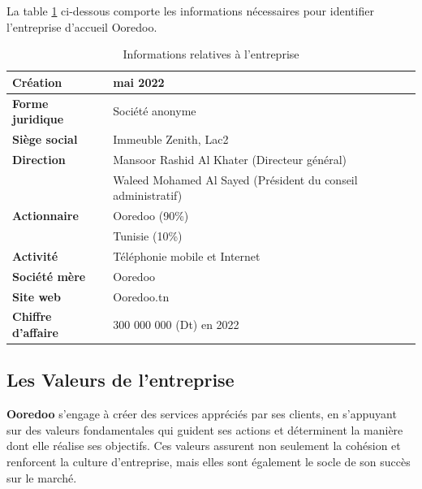 La table \ref{valeursooredoo} ci-dessous comporte les informations nécessaires pour identifier l’entreprise d’accueil Ooredoo.
\begin{table}[H] %
    \renewcommand{\arraystretch}{1.1} %
    \centering
    \begin{tabular}{|>{\centering\arraybackslash}m{5cm}|>{\centering\arraybackslash}m{5cm}|}
        \hline
        \textbf{Création} & 11 mai 2022 \\ \hline
        \textbf{Forme juridique} & Société anonyme \\ \hline
        \textbf{Siège social} & Immeuble Zenith, Lac2 \\ \hline
        \textbf{Direction} & Mansoor Rashid Al Khater (Directeur général) \\ 
        & Waleed Mohamed Al Sayed (Président du conseil administratif) \\ \hline
        \textbf{Actionnaire} & Ooredoo (90\%) \\ 
        & Tunisie (10\%) \\ \hline
        \textbf{Activité} & Téléphonie mobile et Internet \\ \hline
        \textbf{Société mère} & Ooredoo \\ \hline
        \textbf{Site web} & Ooredoo.tn \\ \hline
        \textbf{Chiffre d'affaire} & 1 300 000 000 (Dt) en 2022 \\ \hline
    \end{tabular}
    \caption{Informations relatives à l’entreprise}
    \label{valeursooredoo}
    \end{table}

\subsection{Les Valeurs de l’entreprise}

\begin{sloppypar}
\textbf{Ooredoo} s'engage à créer des services appréciés par ses clients, en s'appuyant sur des valeurs fondamentales qui guident ses actions et déterminent la manière dont elle réalise ses objectifs. Ces valeurs assurent non seulement la cohésion et renforcent la culture d'entreprise, mais elles sont également le socle de son succès sur le marché.
\end{sloppypar}

